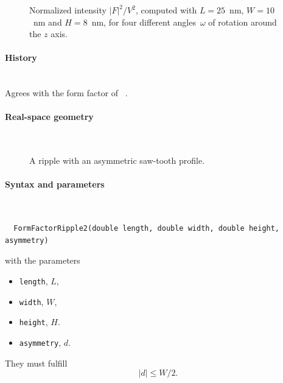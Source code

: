 \begin{figure}[H]
\begin{center}
\end{center}
\caption{Normalized intensity $|F|^2/V^2$,
computed with $L=25$~nm, $W=10$~nm and $H=8$~nm,
for four different angles~$\omega$ of rotation around the $z$ axis.}
\end{figure}

\paragraph{History}\strut\\
Agrees with the  form factor of \FitGISAXS\ \cite{Bab13}.

 \label{SRipple2}

\paragraph{Real-space geometry}\strut\\

\begin{figure}[H]
\hfill
{}
\hfill
{}
\hfill
{}
\hfill
\caption{A ripple with an asymmetric saw-tooth profile.}
\end{figure}

\FloatBarrier

\paragraph{Syntax and parameters}\strut\\[-2ex plus .2ex minus .2ex]
\begin{lstlisting}
  FormFactorRipple2(double length, double width, double height, asymmetry)
\end{lstlisting}
with the parameters
\begin{itemize}
\item \texttt{length}, $L$,
\item \texttt{width}, $W$,
\item \texttt{height}, $H$.
\item \texttt{asymmetry}, $d$.
\end{itemize}
They must fulfill
\begin{displaymath}
  |d| \le W/2.
\end{displaymath}

